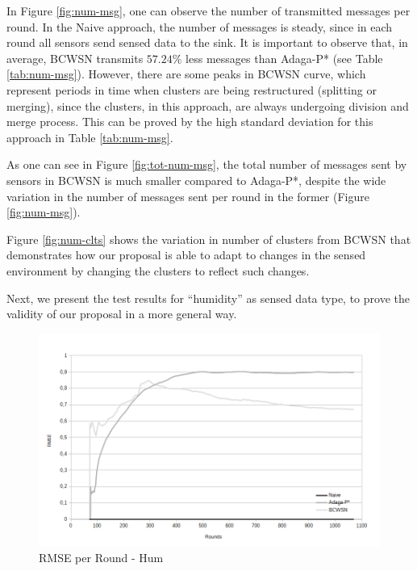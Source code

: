 \documentclass{acm_proc_article-sp}
\begin{document}
In Figure \ref{fig:num-msg}, one can observe the number of transmitted messages
per round. In the Naive approach, the number of messages is steady, since in
each round all sensors send sensed data to the sink. It is important to observe
that, in average, BCWSN transmits $57.24\%$ less messages than Adaga-P* (see Table
\ref{tab:num-msg}). However, there are some peaks in BCWSN curve, which
represent periods in time when clusters are being restructured (splitting or
merging), since the clusters, in this approach, are always undergoing division
and merge process. This can be proved by the high standard deviation for this
approach in Table \ref{tab:num-msg}.
\vspace*{-.3cm}

As one can see in Figure \ref{fig:tot-num-msg}, the total number of messages sent
by sensors in BCWSN is much smaller compared to Adaga-P*, despite the wide variation 
in the number of messages sent per round in the former (Figure \ref{fig:num-msg}).
\vspace*{-.3cm}

Figure \ref{fig:num-clts} shows the variation in number of clusters from BCWSN 
that demonstrates how our proposal is able to adapt to changes in the sensed 
environment by changing the clusters to reflect such changes.
\vspace*{-.3cm}

Next, we present the test results for ``humidity'' as sensed data type, 
to prove the validity of our proposal in a more general way.
\vspace*{-.3cm}

\begin{figure}[!htb]
\begin{center}
	\includegraphics[scale=0.33]{BCWSN-RMSExRound-PB-Hum.png}
    \caption{RMSE per Round - Hum}
    \label{fig:rmse-hum}
\end{center}
\end{figure}
\vspace*{-.3cm}
\end{document}
